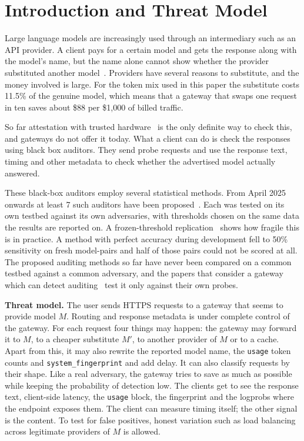 \section{Introduction and Threat Model}\label{sec:intro}
Large language models are increasingly used through an intermediary such as an API
provider. A client pays for a certain model and gets the response along with the model's name,
but the name alone cannot show whether the provider substituted another model~\cite{cai2025}.
Providers have several reasons to substitute, and the money involved is large. For the token mix used in this paper the substitute costs 11.5\% of the genuine
model, which means that a gateway that swaps one request in ten saves about \$88 per \$1,000 of
billed traffic.

So far attestation with trusted hardware~\cite{cai2025} is the only definite way to check
this, and gateways do not offer it today. What a
client can do is check the responses using black box auditors. They send probe requests and use the
response text, timing and other metadata to check whether the advertised model actually answered.

These black-box auditors employ several statistical methods. From April 2025 onwards at least 7
such auditors have been proposed~\cite{cai2025,zhu2025rut,lin2026gatescope,fang2026kbf,bruckner2026,iris2026,difr2025}.
Each was tested on its own testbed against its own adversaries, with thresholds chosen on the
same data the results are reported on. A frozen-threshold replication~\cite{holdout2026} shows
how fragile this is in practice. A method with perfect accuracy during development fell to 50\%
sensitivity on fresh model-pairs and half of those pairs could not be scored at all. The proposed
auditing methods so far have never been compared on a common testbed against a common adversary,
and the papers that consider a gateway which can detect auditing~\cite{cai2025,zhu2025rut,iris2026}
test it only against their own probes.

\textbf{Threat model.} The user sends HTTPS requests to a gateway that seems to provide model $M$.
Routing and response metadata is under complete control of the gateway. For each request four
things may happen: the gateway may forward it to $M$, to a cheaper substitute $M'$, to another
provider of $M$ or to a cache. Apart from this, it may also rewrite the reported model name, the
\texttt{usage} token counts and \texttt{system\_fingerprint} and add
delay. It can also classify requests by their shape. Like a real
adversary, the gateway tries to save as much as possible while keeping the
probability of detection low. The clients get to see the response text, client-side latency, the
\texttt{usage} block, the fingerprint and the logprobs where the endpoint exposes them.
The client can measure timing itself; the other signal is the content. To test for
false positives, honest variation such as load balancing across legitimate providers of
$M$ is allowed.

